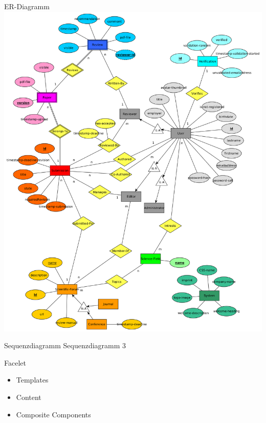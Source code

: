 \documentclass{beamer}
\begin{document}
    \begin{frame}{ER-Diagramm}
        \centering
        \includegraphics[height=0.9\textheight]{../../docs/Entwurf/graphics/ER-Modell.png}
    \end{frame}

    \begin{frame}{Sequenzdiagramm}
        \centering
        Sequenzdiagramm 3
    \end{frame}

    \begin{frame}{Facelet}
        \begin{itemize}
            \item Templates
            \item Content
            \item Composite Components
        \end{itemize}
    \end{frame}
\end{document}
